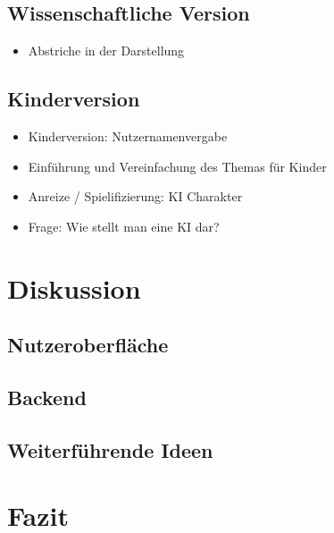 \documentclass[a4paper]{extarticle}
\begin{document}
    \subsection{Wissenschaftliche Version}
    \begin{itemize}
        \item Abstriche in der Darstellung
    \end{itemize}

    \subsection{Kinderversion}
    \begin{itemize}
        \item Kinderversion: Nutzernamenvergabe
        \item Einführung und Vereinfachung des Themas für Kinder 
        \item Anreize / Spielifizierung: KI Charakter
        \item Frage: Wie stellt man eine KI dar?
    \end{itemize}
    
    \section{Diskussion}
    \subsection{Nutzeroberfläche}
    \subsection{Backend}
    \subsection{Weiterführende Ideen}

    \section{Fazit}
    
\end{document}
